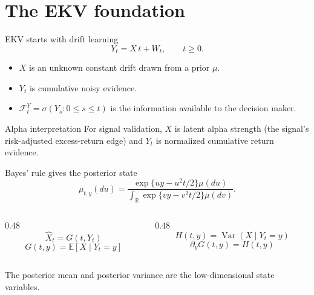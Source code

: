 \documentclass[aspectratio=169,10pt]{beamer}
\newcommand{\E}{\mathbb{E}}
\newcommand{\Var}{\operatorname{Var}}
\newcommand{\F}{\mathcal{F}}
\newcommand{\wh}{\widehat}
\newcommand{\1}{\mathbf{1}}
\begin{document}
\section{The EKV foundation}

\begin{frame}{EKV starts with drift learning}
  \Large
  \[
    Y_t = X\,t + W_t,\qquad t\ge 0 .
  \]

  \vspace{0.8em}

  \normalsize
  \begin{itemize}
    \item \(X\) is an unknown constant drift drawn from a prior \(\mu\).
    \item \(Y_t\) is cumulative noisy evidence.
    \item \(\F_t^Y=\sigma(Y_s:0\le s\le t)\) is the information available to the decision maker.
  \end{itemize}

  \vspace{0.6em}
  \begin{block}{Alpha interpretation}
    For signal validation, \(X\) is latent alpha strength (the signal's risk-adjusted
    excess-return edge) and \(Y_t\) is normalized cumulative return evidence.
  \end{block}
\end{frame}

\begin{frame}{Bayes' rule gives the posterior state}
  \Large
  \[
    \mu_{t,y}(du)
    =
    \frac{\exp\{uy-u^2t/2\}\mu(du)}
    {\int_{\mathbb R}\exp\{vy-v^2t/2\}\mu(dv)} .
  \]

  \vspace{0.8em}

  \begin{columns}[T,onlytextwidth]
    \begin{column}{0.48\textwidth}
      \[
        \wh X_t = G(t,Y_t)
      \]
      \[
        G(t,y)=\E[X\mid Y_t=y]
      \]
    \end{column}
    \begin{column}{0.48\textwidth}
      \[
        H(t,y)=\Var(X\mid Y_t=y)
      \]
      \[
        \partial_y G(t,y)=H(t,y)
      \]
    \end{column}
  \end{columns}

  \vspace{0.4em}
  \normalsize
  The posterior mean and posterior variance are the low-dimensional state variables.
\end{frame}
\end{document}
